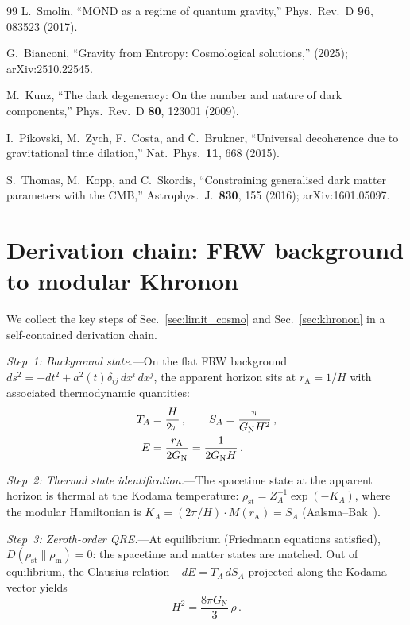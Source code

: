 \documentclass[prd,twocolumn,superscriptaddress,longbibliography,floatfix]{revtex4-2}
\newcommand{\rhost}{\rho_{\mathrm{st}}}
\newcommand{\rhom}{\rho_{\mathrm{m}}}
\newcommand{\GN}{G_{\mathrm{N}}}
\newcommand{\rA}{r_{\mathrm{A}}}
\begin{document}
\begin{thebibliography}{99}
L.~Smolin,
``MOND as a regime of quantum gravity,''
Phys.\ Rev.\ D \textbf{96}, 083523 (2017).

G.~Bianconi,
``Gravity from Entropy: Cosmological solutions,''
(2025); arXiv:2510.22545.

M.~Kunz,
``The dark degeneracy: On the number and nature of
dark components,''
Phys.\ Rev.\ D \textbf{80}, 123001 (2009).

I.~Pikovski, M.~Zych, F.~Costa, and \v{C}.~Brukner,
``Universal decoherence due to gravitational time
dilation,''
Nat.\ Phys.\ \textbf{11}, 668 (2015).

S.~Thomas, M.~Kopp, and C.~Skordis,
``Constraining generalised dark matter parameters with
the CMB,''
Astrophys.\ J.\ \textbf{830}, 155 (2016);
arXiv:1601.05097.

\end{thebibliography}


\appendix
\section{Derivation chain: FRW background to modular Khronon}
\label{app:derivation}

We collect the key steps of Sec.~\ref{sec:limit_cosmo}
and Sec.~\ref{sec:khronon} in a self-contained
derivation chain.

\emph{Step~1: Background state.}---On the flat FRW
background
$ds^2 = -dt^2 + a^2(t)\delta_{ij}\,dx^i\,dx^j$,
the apparent horizon sits at $\rA = 1/H$ with
associated thermodynamic quantities:
\begin{align}
T_A &= \frac{H}{2\pi}\,,\qquad
S_A = \frac{\pi}{\GN H^2}\,,\notag\\
E &= \frac{\rA}{2\GN} = \frac{1}{2\GN H}\,.
\label{eq:app_background}
\end{align}

\emph{Step~2: Thermal state identification.}---The
spacetime state at the apparent horizon is thermal
at the Kodama temperature:
$\rhost = Z_A^{-1}\exp(-K_A)$,
where the modular Hamiltonian is
$K_A = (2\pi/H)\cdot M(\rA) = S_A$
(Aalsma--Bak~\cite{AalsmaBak2025}).

\emph{Step~3: Zeroth-order QRE.}---At equilibrium
(Friedmann equations satisfied),
$D(\rhost\|\rhom) = 0$: the spacetime and matter
states are matched.  Out of equilibrium, the
Clausius relation $-dE = T_A\,dS_A$ projected along
the Kodama vector yields~\cite{CaiKim2005}
\begin{equation}
H^2 = \frac{8\pi\GN}{3}\,\rho\,.
\end{equation}
\end{document}
